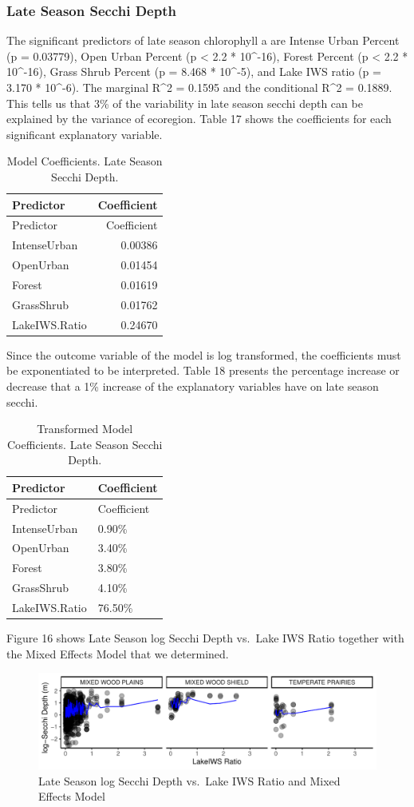 \documentclass[12pt,]{article}
\begin{document}
\hypertarget{late-season-secchi-depth}{%
\subsubsection{Late Season Secchi
Depth}\label{late-season-secchi-depth}}

The significant predictors of late season chlorophyll a are Intense
Urban Percent (p = 0.03779), Open Urban Percent (p \textless{} 2.2 *
10\^{}-16), Forest Percent (p \textless{} 2.2 * 10\^{}-16), Grass Shrub
Percent (p = 8.468 * 10\^{}-5), and Lake IWS ratio (p = 3.170 *
10\^{}-6). The marginal R\^{}2 = 0.1595 and the conditional R\^{}2 =
0.1889. This tells us that 3\% of the variability in late season secchi
depth can be explained by the variance of ecoregion. Table 17 shows the
coefficients for each significant explanatory variable.

\newpage

\begin{longtable}[]{@{}lr@{}}
\caption{Model Coefficients. Late Season Secchi Depth.}\tabularnewline
\toprule
Predictor & Coefficient\tabularnewline
\midrule
\endfirsthead
\toprule
Predictor & Coefficient\tabularnewline
\midrule
\endhead
IntenseUrban & 0.00386\tabularnewline
OpenUrban & 0.01454\tabularnewline
Forest & 0.01619\tabularnewline
GrassShrub & 0.01762\tabularnewline
LakeIWS.Ratio & 0.24670\tabularnewline
\bottomrule
\end{longtable}

Since the outcome variable of the model is log transformed, the
coefficients must be exponentiated to be interpreted. Table 18 presents
the percentage increase or decrease that a 1\% increase of the
explanatory variables have on late season secchi.

\begin{longtable}[]{@{}ll@{}}
\caption{Transformed Model Coefficients. Late Season Secchi
Depth.}\tabularnewline
\toprule
Predictor & Coefficient\tabularnewline
\midrule
\endfirsthead
\toprule
Predictor & Coefficient\tabularnewline
\midrule
\endhead
IntenseUrban & 0.90\%\tabularnewline
OpenUrban & 3.40\%\tabularnewline
Forest & 3.80\%\tabularnewline
GrassShrub & 4.10\%\tabularnewline
LakeIWS.Ratio & 76.50\%\tabularnewline
\bottomrule
\end{longtable}

Figure 16 shows Late Season log Secchi Depth vs.~Lake IWS Ratio together
with the Mixed Effects Model that we determined.

\begin{figure}
\centering
\includegraphics{Bollt_Greif_Raby_Roth_Project_Final_files/figure-latex/unnamed-chunk-35-1.pdf}
\caption{Late Season log Secchi Depth vs.~Lake IWS Ratio and Mixed
Effects Model}
\end{figure}
\end{document}
